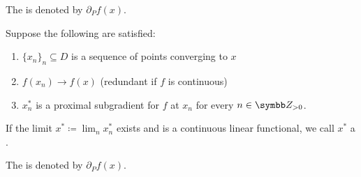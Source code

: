\begin{definition}
\begin{defenum}
    The  is denoted by \( \partial_P f(x) \).

    \cite[definition 11.10]{Clarke2013} Suppose the following are satisfied:
    \begin{enumerate}
      \item \( \{ x_n \}_n \subseteq D \) is a sequence of points converging to \( x \)
      \item \( f(x_n) \to f(x) \) (redundant if \( f \) is continuous)
      \item \( x_n^* \) is a proximal subgradient for \( f \) at \( x_n \) for every \( n \in \BZ_{>0} \).
    \end{enumerate}

    If the limit \( x^* \coloneqq \lim_n x_n^* \) exists and is a continuous linear functional, we call \( x^* \) a .

    The  is denoted by \( \partial_P f(x) \).
  \end{defenum}
\end{definition}
